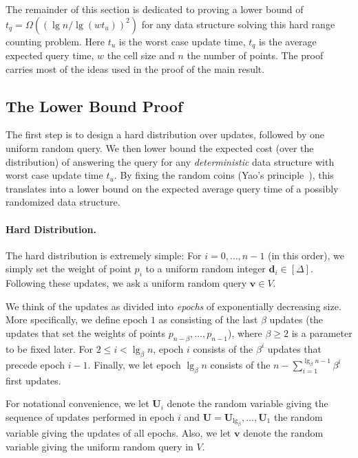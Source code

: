 \documentclass[letterpaper]{article}
\newcommand{\rdelta}{\textbf{d}}
\newcommand{\U}{\textbf{U}}
\newcommand{\vs}{\textbf{v}}
\begin{document}
The remainder of this section is dedicated to proving a lower bound of
$t_q = \Omega((\lg n/\lg(wt_u))^2)$ for any data structure solving
this hard range counting problem. Here $t_u$ is the worst case update
time, $t_q$ is the average expected query time, $w$ the cell size and
$n$ the number of points. The proof carries most of the ideas used in
the proof of the main result.

\subsection{The Lower Bound Proof}
The first step is to design a hard distribution over updates, followed
by one uniform random query. We then lower bound the expected cost
(over the distribution) of answering the query for any
\emph{deterministic} data structure with worst case update time
$t_u$. By fixing the random coins (Yao's
principle~\cite{Yao:principle}), this translates into a lower bound on
the expected average query time of a possibly randomized data
structure.

\paragraph{Hard Distribution.}
The hard distribution is extremely simple: For $i=0,\dots,n-1$ (in
this order), we simply set the weight of point $p_i$ to a uniform
random integer $\rdelta_i \in [\Delta]$. Following these updates, we
ask a uniform random query $\vs \in V$.

We think of the updates as divided into \emph{epochs} of exponentially
decreasing size. More specifically, we define epoch $1$ as consisting
of the last $\beta$ updates (the updates that set the weights of
points $p_{n-\beta},\dots,p_{n-1}$), where $\beta \geq 2$ is a
parameter to be fixed later. For $2 \leq i < \lg_\beta n$, epoch $i$
consists of the $\beta^i$ updates that precede epoch $i-1$. Finally,
we let epoch $\lg_\beta n$ consists of the $n-\sum_{i=1}^{\lg_\beta
  n-1} \beta^i$ first updates.

For notational convenience, we let $\U_i$ denote the random variable
giving the sequence of updates performed in epoch $i$ and
$\U=\U_{\lg_\beta},\dots,\U_1$ the random variable giving the updates
of all epochs. Also, we let $\vs$ denote the random variable giving the
uniform random query in $V$.
\end{document}
